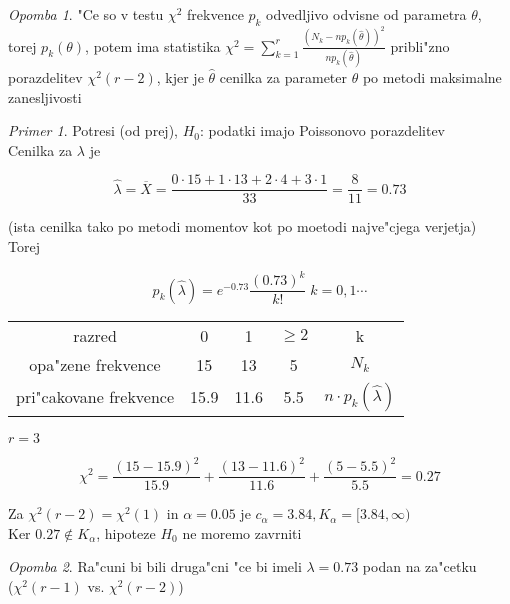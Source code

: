 \documentclass[a4paper,12pt]{article}
\theoremstyle{definition}
\theoremstyle{remark}
\newtheorem*{ex}{Primer}
\newtheorem*{rem}{Opomba}
\begin{document}
\begin{rem}
    "Ce so v testu $\chi^2$ frekvence $p_k$ odvedljivo odvisne od parametra $\theta$, torej $p_k(\theta)$, potem ima
    statistika $\chi^2 = \sum_{k=1}^{r} \frac{(N_k - n p_k(\hat{\theta}))^2}{n p_k(\hat{\theta})}$ pribli"zno
    porazdelitev $\chi^2(r-2)$, kjer je $\hat{\theta}$ cenilka za parameter $\theta$ po metodi maksimalne zanesljivosti
\end{rem}

\begin{ex}
    Potresi (od prej), $H_0$: podatki imajo Poissonovo porazdelitev \\
    Cenilka za $\lambda$ je 
    
    \begin{equation*}
        \hat{\lambda} = \overline{X} = \frac{0 \cdot 15 + 1 \cdot 13 + 2 \cdot 4 + 3 \cdot 1}{33} = \frac{8}{11} = 0.73
    \end{equation*}

    (ista cenilka tako po metodi momentov kot po moetodi najve"cjega verjetja) \\
    Torej

    \begin{equation*}
        p_k(\hat{\lambda}) = e^{-0.73} \frac{(0.73)^k}{k!} \; k = 0, 1 \cdots
    \end{equation*}

    \begin{center}
        \begin{tabular}{c c c c c}
            razred & 0 & 1 & $\geq 2$ & k \\
            opa"zene frekvence & 15 & 13 & 5 & $N_k$ \\
            pri"cakovane frekvence & 15.9 & 11.6 & 5.5 & $n \cdot p_k(\hat{\lambda})$
        \end{tabular}
    \end{center}

    $r=3$

    \begin{equation*}
        \chi^2 = \frac{(15-15.9)^2}{15.9} + \frac{(13-11.6)^2}{11.6} + \frac{(5-5.5)^2}{5.5} = 0.27
    \end{equation*}

    Za $\chi^2(r-2) = \chi^2(1)$ in $\alpha = 0.05$ je $c_{\alpha} = 3.84, K_{\alpha} = [3.84, \infty)$ \\
    Ker $0.27 \notin K_{\alpha}$, hipoteze $H_0$ ne moremo zavrniti
\end{ex}

\begin{rem}
    Ra"cuni bi bili druga"cni "ce bi imeli $\lambda = 0.73$ podan na za"cetku \\
    ($\chi^2(r-1)$ vs. $\chi^2(r-2)$)
\end{rem}
\end{document}
